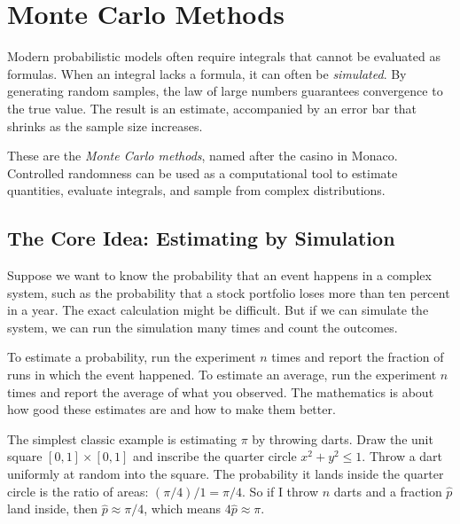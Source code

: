\chapter{Monte Carlo Methods}

Modern probabilistic models often require integrals that cannot be evaluated as formulas.
When an integral lacks a formula, it can often be \emph{simulated}.
By generating random samples, the law of large numbers guarantees convergence to the true value.
The result is an estimate, accompanied by an error bar that shrinks as the sample size increases.

These are the \emph{Monte Carlo methods}, named after the casino in Monaco.
Controlled randomness can be used as a computational tool to estimate quantities,
evaluate integrals, and sample from complex distributions.

\section{The Core Idea: Estimating by Simulation}
\label{ch35:core-idea}

Suppose we want to know the probability that an event happens in a complex system,
such as the probability that a stock portfolio loses more than ten percent in a year.
The exact calculation might be difficult. But if we can simulate the system,
we can run the simulation many times and count the outcomes.

\begin{intuitionbox}
To estimate a probability, run the experiment $n$ times and report the fraction
of runs in which the event happened. To estimate an average, run the experiment
$n$ times and report the average of what you observed.
The mathematics is about how good these estimates are and how to make them
better.
\end{intuitionbox}

The simplest classic example is estimating $\pi$ by throwing darts. Draw the
unit square $[0,1]\times[0,1]$ and inscribe the quarter circle $x^2+y^2\le 1$.
Throw a dart uniformly at random into the square. The probability it lands
inside the quarter circle is the ratio of areas: $(\pi/4)/1 = \pi/4$. So if I
throw $n$ darts and a fraction $\hat p$ land inside, then $\hat p \approx \pi/4$,
which means $4\hat p \approx \pi$.

